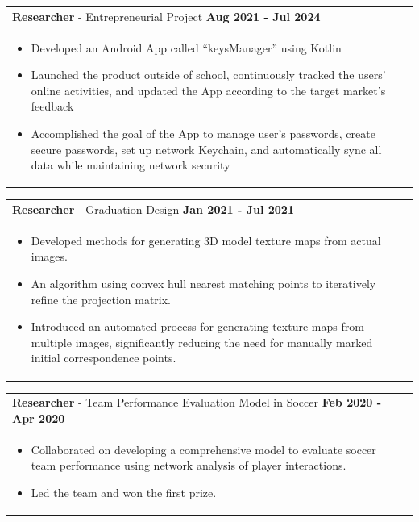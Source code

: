 \documentclass[a4paper,12pt]{article}
\begin{document}
\begin{tabularx}{\linewidth}{ @{}l r@{} }
\textbf{Researcher} - Entrepreneurial Project \hfill \textbf{Aug 2021 - Jul 2024} \\[4pt]
\begin{minipage}[t]{\linewidth}
    \begin{itemize}[nosep,after=\strut, leftmargin=1em, itemsep=2pt]
        \item Developed an Android App called “keysManager” using Kotlin
        \item Launched the product outside of school, continuously tracked the users' online activities, and updated the
        App according to the target market's feedback
        \item Accomplished the goal of the App to manage user's passwords, create secure passwords, set up network
        Keychain, and automatically sync all data while maintaining network security
    \end{itemize}
\end{minipage}
\end{tabularx}

\begin{tabularx}{\linewidth}{ @{}l r@{} }
\textbf{Researcher} - Graduation Design \hfill \textbf{Jan 2021 - Jul 2021} \\[4pt]
\begin{minipage}[t]{\linewidth}
    \begin{itemize}[nosep,after=\strut, leftmargin=1em, itemsep=2pt]
        \item Developed methods for generating 3D model texture maps from actual images.
        \item An algorithm using convex hull nearest matching points to iteratively refine the projection matrix.
        \item Introduced an automated process for generating texture maps from multiple images, significantly reducing the need for manually marked initial correspondence points.
    \end{itemize}
\end{minipage}
\end{tabularx}

\begin{tabularx}{\linewidth}{ @{}l r@{} }
    \textbf{Researcher} - Team Performance Evaluation Model in Soccer \hfill \textbf{Feb 2020 - Apr 2020} \\[4pt]
    \begin{minipage}[t]{\linewidth}
        \begin{itemize}[nosep,after=\strut, leftmargin=1em, itemsep=2pt]
            \item Collaborated on developing a comprehensive model to evaluate soccer team performance using network analysis of player interactions.
            \item Led the team and won the first prize.
        \end{itemize}
    \end{minipage}
    \end{tabularx}
\end{document}

